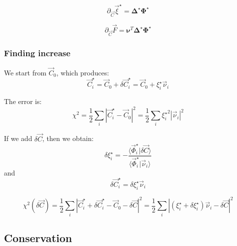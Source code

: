 \documentclass[aps,12pt]{revtex4}
\begin{document}
\begin{equation}
	\partial_{\vec C} \vec \xi^\star = \bm{\Delta}^\star \bm{\Phi}^\star 
\end{equation}

\begin{equation}
	\partial_{\vec C} \vec F = \bm{\nu}^T \bm{\Delta}^\star \bm{\Phi}^\star 
\end{equation}

\subsubsection{Finding increase}
 
 We start from $\vec C _0$, which produces:
 \begin{equation}
 	\vec C_i^\star = \vec C_0 + \delta \vec C_i^\star = \vec C_0 + \xi_i^\star \vec \nu_i
 \end{equation}
 
 The error is:
 \begin{equation}
 	\chi^2 = \dfrac{1}{2} \sum_i \left\vert \vec{C}_i^\star - \vec{C}_0 \right \vert^2
	 = \dfrac{1}{2} \sum_i {\xi_i^\star}^2 \left\vert \vec \nu_i \right\vert^2
 \end{equation}
 
 If we add $\delta \vec C$, then we obtain:
 \begin{equation}
 	\delta \xi_i^\star = - \dfrac{\langle \vec \Phi_i^\star \vert \delta \vec C\rangle}{\langle \vec \Phi_i^\star \vert \vec\nu_i \rangle}
 \end{equation}
 and
 \begin{equation}
 	\delta \vec C_i^\star = \delta \xi_i^\star \vec \nu _i
 \end{equation}
 
 \begin{equation}
 	\chi^2(\delta \vec C) = \dfrac{1}{2}
	\sum_i 
	\left \vert
	\vec C_i^\star + \delta \vec C_i^\star - \vec{C}_0 - \delta \vec C
	\right\vert^2
	=\dfrac{1}{2}
	\sum_i\left \vert
	(\xi_i^\star+\delta \xi_i^\star) \vec\nu_i - \delta \vec{C}
	\right\vert^2
 \end{equation}	
 

\subsection{Conservation}
\end{document}
